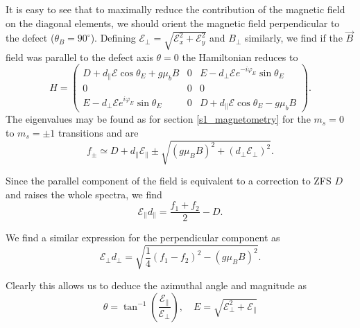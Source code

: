 It is easy to see that to maximally reduce the contribution of the magnetic field on the diagonal elements, we should orient the magnetic field perpendicular to the defect ($\theta_B = 90^\circ$). Defining $\mathcal{E}_\perp = \sqrt{\mathcal{E}_x^2 + \mathcal{E}_y^2}$ and $B_\perp$ similarly, we find if the $\vec{B}$ field was parallel to the defect axis $\theta = 0$ the Hamiltonian reduces to \begin{equation}
H = \begin{pmatrix}
	D + d_\parallel \mathcal{E}\cos\theta_E + g\mu_b B & 0                                                                        & E - d_\perp \mathcal{E} e^{-i \varphi_E}\sin\theta_E                  \\
	0                                                  & 0                                                                        & 0    \\
	E - d_\perp\mathcal{E}e^{i \varphi_E}\sin\theta_E  & 0 & D+ d_\parallel \mathcal{E}\cos\theta_E - g\mu_b B 
\end{pmatrix}.
\label{eq:}
\end{equation}
The eigenvalues may be found as for section \ref{s1_magnetometry} for the $m_s = 0$ to $m_s = \pm 1$ transitions and are  
\begin{equation}
    f_{\pm} \simeq D + d_\parallel \mathcal{E}_\parallel\pm \sqrt{(g \mu_B B)^2 + (d_\perp\mathcal{E}_\perp)^2  }. 
    \label{eq:}
\end{equation}

Since the parallel component of the field is equivalent to a correction to ZFS $D$ and raises the whole spectra, we find 
\begin{equation}
    \mathcal{E}_\parallel d_\parallel = \frac{f_1 + f_2}{2} - D. 
    \label{eq:}
\end{equation}

We find a similar expression for the perpendicular component as 
\begin{equation}
    \mathcal{E}_\perp d_\perp = \sqrt{\frac{1}{4}(f_1 - f_2)^2-(g \mu_B B)^2}.
    \label{eq:}
\end{equation}

Clearly this allows us to deduce the azimuthal angle and magnitude as
\begin{equation}
    \theta = \tan^{-1} \left(\frac{\mathcal{E}_\parallel}{\mathcal{E}_\perp}\right), \quad E = \sqrt{\mathcal{E}_\perp^2 + \mathcal{E}_\parallel}
    \label{eq:}
\end{equation}


